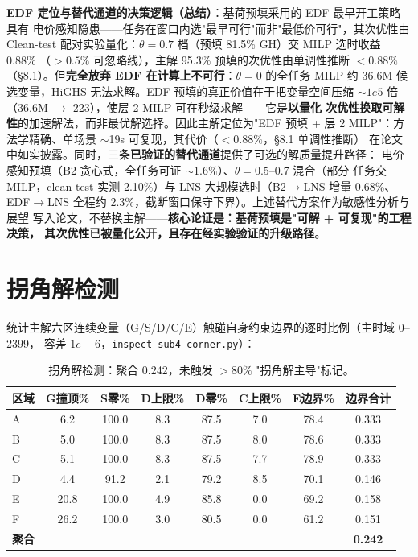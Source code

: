 \documentclass{internal-report}
\begin{document}
\textbf{EDF 定位与替代通道的决策逻辑（总结）}：基荷预填采用的 EDF 最早开工策略具有
电价感知隐患——任务在窗口内选"最早可行"而非"最低价可行"，其次优性由 Clean-test
配对实验量化：$\theta{=}0.7$ 档（预填 81.5\% GH）交 MILP 选时收益 0.88\%
（$>0.5\%$ 可忽略线），主解 95.3\% 预填的次优性由单调性推断 \textbf{$<0.88\%$}
（§8.1）。但\textbf{完全放弃 EDF 在计算上不可行}：$\theta{=}0$ 的全任务 MILP 约
36.6M 候选变量，HiGHS 无法求解。EDF 预填的真正价值在于把变量空间压缩
$\sim 1e5$ 倍（36.6M $\to$ 223），使层 2 MILP 可在秒级求解——它是\textbf{以量化
次优性换取可解性}的加速解法，而非最优解选择。因此主解定位为"EDF 预填 + 层 2
MILP"：方法学精确、单场景 $\sim$19s 可复现，其代价（$<0.88\%$，§8.1 单调性推断）
在论文中如实披露。同时，三条\textbf{已验证的替代通道}提供了可选的解质量提升路径：
电价感知预填（B2 贪心式，全任务可证 $\sim 1.6\%$）、$\theta{=}0.5$--0.7 混合（部分
任务交 MILP，clean-test 实测 2.10\%）与 LNS 大规模选时（B2$\to$LNS 增量 0.68\%、
EDF$\to$LNS 全程约 2.3\%，截断窗口保守下界）。上述替代方案作为敏感性分析与展望
写入论文，不替换主解——\textbf{核心论证是：基荷预填是"可解 + 可复现"的工程决策，
其次优性已被量化公开，且存在经实验验证的升级路径}。

\section{拐角解检测}

统计主解六区连续变量（G/S/D/C/E）触碰自身约束边界的逐时比例（主时域 0--2399，
容差 $1e{-}6$，\texttt{inspect-sub4-corner.py}）：

\begin{table}[H]
\centering
\footnotesize
\begin{tabular}{lccccccc}
\toprule
区域 & G撞顶\% & S零\% & D上限\% & D零\% & C上限\% & E边界\% & 边界合计 \\
\midrule
A & 6.2 & 100.0 & 8.3 & 87.5 & 7.0 & 78.4 & 0.333 \\
B & 5.0 & 100.0 & 8.3 & 87.5 & 8.0 & 78.6 & 0.333 \\
C & 5.1 & 100.0 & 8.3 & 87.5 & 7.7 & 78.9 & 0.333 \\
D & 4.4 & 91.2 & 2.1 & 79.2 & 8.5 & 70.1 & 0.146 \\
E & 20.8 & 100.0 & 4.9 & 85.8 & 0.0 & 69.2 & 0.158 \\
F & 26.2 & 100.0 & 3.0 & 80.5 & 0.0 & 61.2 & 0.151 \\
\midrule
\textbf{聚合} & & & & & & & \textbf{0.242} \\
\bottomrule
\end{tabular}
\caption{拐角解检测：聚合 0.242，未触发 $>80\%$ "拐角解主导"标记。}
\label{tab:corner}
\end{table}
\end{document}
